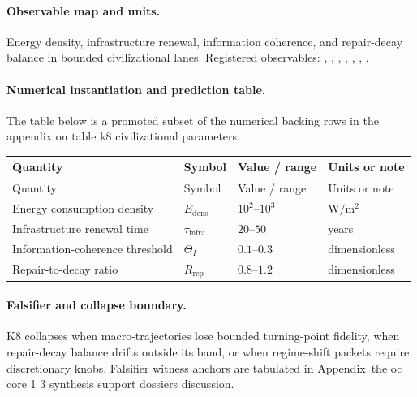 \paragraph{Observable map and units.}
Energy density, infrastructure renewal, information coherence, and repair-decay balance in bounded civilizational lanes.
Registered observables: , \allowbreak {}, \allowbreak {}, \allowbreak {}, \allowbreak {}, \allowbreak {}, \allowbreak {}.

\paragraph{Numerical instantiation and prediction table.}
The table below is a promoted subset of the numerical backing rows in the appendix on table k8 civilizational parameters.
\begin{longtable}{@{}L{0.27\textwidth}L{0.15\textwidth}L{0.24\textwidth}L{0.16\textwidth}@{}}
\toprule
Quantity & Symbol & Value / range & Units or note \\
\midrule
\endfirsthead
\toprule
Quantity & Symbol & Value / range & Units or note \\
\midrule
\endhead
Energy consumption density & $\scriptstyle E_{\mathrm{dens}}$ & $10^2\text{--}10^3$ & $\mathrm{W/m^2}$ \\
Infrastructure renewal time & $\scriptstyle \tau_{\mathrm{infra}}$ & $20\text{--}50$ & years \\
Information-coherence threshold & $\scriptstyle \Theta_I$ & $0.1\text{--}0.3$ & dimensionless \\
Repair-to-decay ratio & $\scriptstyle R_{\mathrm{rep}}$ & $0.8\text{--}1.2$ & dimensionless \\
\bottomrule
\end{longtable}

\paragraph{Falsifier and collapse boundary.}
K8 collapses when macro-trajectories lose bounded turning-point fidelity, when repair-decay balance drifts outside its band, or when regime-shift packets require discretionary knobs.
Falsifier witness anchors are tabulated in Appendix~the oc core 1 3 synthesis support dossiers discussion.

